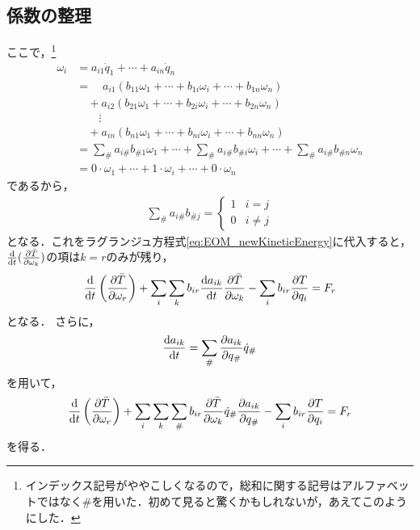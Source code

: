 \documentclass[a4j,10pt]{jsarticle}
\newcommand{\bbn}[2]{\frac{{\rm {\rm d}} #1}{{\rm {\rm d}} #2}}
\newcommand{\henbbn}[2]{\frac{\partial #1}{\partial #2}}
\begin{document}
\subsection*{係数の整理}
ここで，\footnote{インデックス記号がややこしくなるので，総和に関する記号はアルファベットではなく$\#$を用いた．初めて見ると驚くかもしれないが，あえてこのようにした．}
\begin{align*}
    \omega_i   &= a_{i1}\dot{q}_1 + \cdots + a_{in}\dot{q}_n\\
                &=\quad  a_{i1}(b_{11}\omega_1+\cdots+b_{1i}\omega_i+\cdots+b_{1n}\omega_n)\\
                &\quad + a_{i2}(b_{21}\omega_1+\cdots+b_{2i}\omega_i+\cdots+b_{2n}\omega_n)\\
                &\quad\quad \vdots\\
                &\quad + a_{in}(b_{n1}\omega_1+\cdots+b_{ni}\omega_i+\cdots+b_{nn}\omega_n)\\
                &=\sum_\# a_{i\#}b_{\# 1}\omega_1 + \cdots + \sum_\# a_{i\#}b_{\# i}\omega_i + \cdots + \sum_\# a_{i\#}b_{\# n}\omega_n\\
                &=0\cdot\omega_1+\cdots+1\cdot\omega_i+\cdots+0\cdot\omega_n
\end{align*}
であるから，
\begin{align*}
    \sum_\# a_{i\#}b_{\# j}=\begin{cases}
    1 & i = j\\
    0 & i \neq j
    \end{cases}
\end{align*}
となる．これをラグランジュ方程式\eqref{eq:EOM_newKineticEnergy}に代入すると，$\bbn{}{t}(\henbbn{\bar{T}}{\omega_k})$の項は$k=r$のみが残り，
\begin{align}
    \bbn{}{t}\left(\henbbn{\bar{T}}{\omega_r}\right)+\sum_i\sum_k b_{ir}\bbn{a_{ik}}{t}\henbbn{\bar{T}}{\omega_k}-\sum_i b_{ir}\henbbn{T}{q_i}=F_r
\end{align}
となる．
さらに，
\begin{align*}
    \bbn{a_{ik}}{t} = \sum_\# \henbbn{a_{ik}}{q_\#}\dot{q}_\#
\end{align*}
を用いて，
\begin{align}
    \bbn{}{t}\left(\henbbn{\bar{T}}{\omega_r}\right)+\sum_i\sum_k\sum_\# b_{ir}\henbbn{\bar{T}}{\omega_k}\dot{q}_\# \henbbn{a_{ik}}{q_\#}-\sum_i b_{ir}\henbbn{T}{q_i}=F_r
    \label{eq:EOM_arrangedCoefficinets}
\end{align}
を得る．
\end{document}

